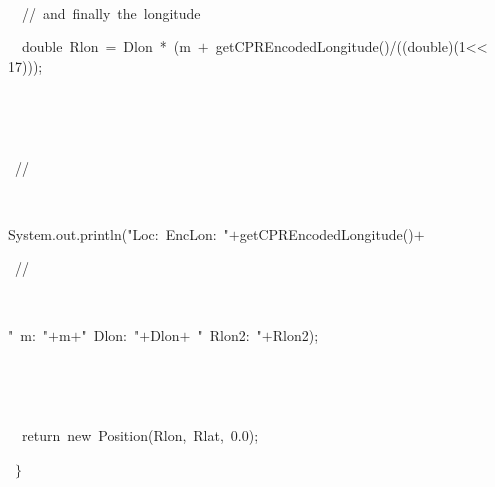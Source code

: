 {{$${\ }}{\hlstd\ \ }{\hlstd \leavevmode\par
{\ }\ //\ and\ finally\ the\ longitude\leavevmode\par
{\ }\ double\ Rlon\ $\mathord{=}$\ Dlon\ *\ (m\ $\mathord{+}$\ getCPREncodedLongitude()/((double)(1$\mathord{<}$$\mathord{<}$17)));\leavevmode\par
{\ }}{\hlstd\ \ }{\hlstd \leavevmode\par
{\ }//}{\hlstd\ \ }{\hlstd System.out.println("Loc:\ EncLon:\ "$\mathord{+}$getCPREncodedLongitude()$\mathord{+}$\leavevmode\par
{\ }//}{\hlstd\ \ \ \ }{\hlstd "\ m:\ "$\mathord{+}$m$\mathord{+}$"\ Dlon:\ "$\mathord{+}$Dlon$\mathord{+}$\ "\ Rlon2:\ "$\mathord{+}$Rlon2);\leavevmode\par
{\ }}{\hlstd\ \ }{\hlstd \leavevmode\par
{\ }\ return\ new\ Position(Rlon,\ Rlat,\ 0.0);\leavevmode\par
{\ }$\}$}\leavevmode\par
}
